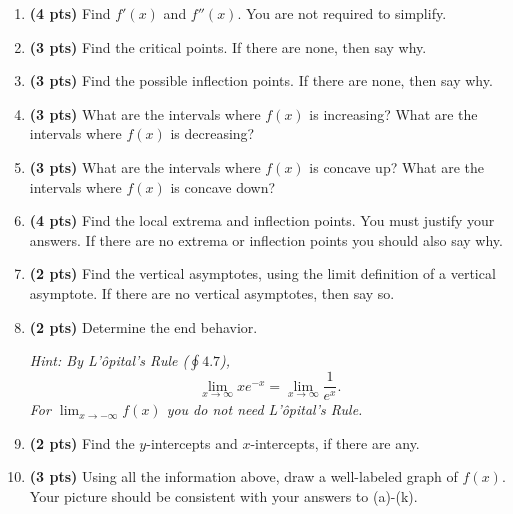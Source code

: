 \documentclass[12pt,letterpaper]{article}
\begin{document}
\begin{enumerate}[1.]
\begin{enumerate}
	\vspace{10pc}
	\item {\bf (4 pts)} Find $f'(x)$ and $f''(x)$.  You are not required to simplify.
	
	\newpage
	\item {\bf (3 pts)} Find the critical points.  If there are none, then say why.
	
	\vspace{14pc}
	\item {\bf (3 pts)} Find the possible inflection points.  If there are none, then say why.
	
	\vspace{14pc}
	\item {\bf (3 pts)} What are the intervals where $f(x)$ is increasing?  What are the intervals where $f(x)$ is decreasing?
	
	\newpage
	\item {\bf (3 pts)} What are the intervals where $f(x)$ is concave up?  What are the intervals where $f(x)$ is concave down?
	
	\vspace{23pc}
	\item {\bf (4 pts)} Find the local extrema and inflection points.  You must justify your answers.  If there are no extrema or inflection points you should also say why.
	
	\newpage
	\item {\bf (2 pts)} Find the vertical asymptotes, using the limit definition of a vertical asymptote.  If there are no vertical asymptotes, then say so.
	
	\vspace{14pc}
	\item {\bf (2 pts)} Determine the end behavior.  
	
	{\it Hint: By L'\^opital's Rule ($\oint 4.7$), 
	\[\displaystyle\lim_{x\to\infty}xe^{-x}=\lim_{x\to\infty}\frac{1}{e^x}.\]  
	For $\displaystyle\lim_{x\to -\infty}f(x)$ you do not need L'\^opital's Rule.} 
	
	\newpage
	\item {\bf (2 pts)} Find the $y$-intercepts and $x$-intercepts, if there are any.  
	
	\vspace{18pc}
	\item {\bf (3 pts)} Using all the information above, draw a well-labeled graph of $f(x)$.  Your picture should be consistent with your answers to (a)-(k).
	\end{enumerate}
	

\end{enumerate}
\end{document}
